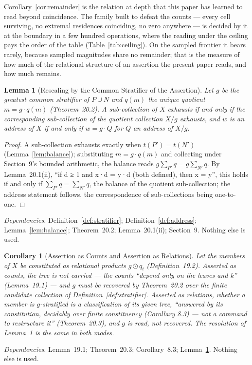 \documentclass[pdflatex,sn-mathphys-num]{sn-jnl}
\theoremstyle{thmstyleone}%
\newtheorem{lemma}[theorem]{Lemma}
\newtheorem{corollary}[theorem]{Corollary}
\theoremstyle{thmstyletwo}%
\theoremstyle{thmstylethree}%
\newtheorem{lemma}[theorem]{Lemma}
\newtheorem{corollary}[theorem]{Corollary}
\newcommand{\q}[1]{``#1''}        %
\newcommand{\deps}[1]{\par\begin{sloppypar}\noindent\emph{Dependencies.} #1 Nothing else is used.\end{sloppypar}}
\begin{document}
\begin{table}[!htbp]
\centering\small
\caption{The remainder class on the certificate family of Table~\ref{tab:ceiling} (Protocol~D.8): asserted magnitudes $\equiv1$, reversed $\equiv0 \pmod n$, $|P|=n/2<n$. The relation by $n$, recovered from counts with every subtraction charged, discards every cell; the certificate is returned at the boundary. Means of ten per row.}
\label{tab:remainder}

\end{table}

\noindent Corollary~\ref{cor:remainder} is the relation at depth that this paper has learned to read beyond coincidence. The family built to defeat the counts --- every cell surviving, no extremal residences coinciding, no zero anywhere --- is decided by it at the boundary in a few hundred operations, where the reading under the ceiling pays the order of the table (Table~\ref{tab:ceiling}). On the sampled frontier it bears rarely, because sampled magnitudes share no remainder; that is the measure of how much of the relational structure of an assertion the present paper reads, and how much remains.

\begin{lemma}[Rescaling by the Common Stratifier of the Assertion]\label{lem:rescale}
Let $g$ be the greatest common stratifier of $P\cup N$ and $q(m)$ the unique quotient $m=g\cdot q(m)$ (Theorem~20.2). A sub-collection of $X$ exhausts if and only if the corresponding sub-collection of the quotient collection $X/g$ exhausts, and $w$ is an address of $X$ if and only if $w=g\cdot Q$ for $Q$ an address of $X/g$.
\end{lemma}
\begin{proof}
A sub-collection exhausts exactly when $t(P')=t(N')$ (Lemma~\ref{lem:balance}); substituting $m=g\cdot q(m)$ and collecting under Section~9's bounded arithmetic, the balance reads $g\sum_{P'}q=g\sum_{N'}q$. By Lemma~20.1(ii), \q{if d ≥ 1 and x·d = y·d (both defined), then x = y}, this holds if and only if $\sum_{P'}q=\sum_{N'}q$, the balance of the quotient sub-collection; the address statement follows, the correspondence of sub-collections being one-to-one.
\end{proof}
\deps{Definition~\ref{def:stratifier}; Definition~\ref{def:address}; Lemma~\ref{lem:balance}; Theorem~20.2; Lemma~20.1(ii); Section~9.}

\begin{corollary}[Assertion as Counts and Assertion as Relations]\label{cor:modes}
Let the members of $X$ be constituted as relational products $g\odot q_i$ (Definition~19.2). Asserted as counts, the tree is not carried --- the counts \q{depend only on the leaves and k} (Lemma~19.1) --- and $g$ must be recovered by Theorem~20.2 over the finite candidate collection of Definition~\ref{def:stratifier}. Asserted as relations, whether a member is $g$-stratified is a classification of its given tree, \q{answered by its constitution, decidably over finite constituency (Corollary 8.3) — not a command to restructure it} (Theorem~20.3), and $g$ is read, not recovered. The resolution of Lemma~\ref{lem:rescale} is the same in both modes.
\end{corollary}
\deps{Lemma~19.1; Theorem~20.3; Corollary~8.3; Lemma~\ref{lem:rescale}.}
\end{document}
